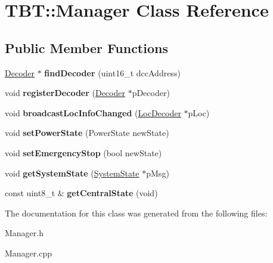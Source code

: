 \hypertarget{classTBT_1_1Manager}{}\section{T\+BT\+:\+:Manager Class Reference}
\label{classTBT_1_1Manager}
\subsection*{Public Member Functions}
\begin{DoxyCompactItemize}
\item 
\mbox{\label{classTBT_1_1Manager_a04d5ae5069f1f17ee682f4ae68141687}} 
\hyperlink{classTBT_1_1Decoder}{Decoder} $\ast$ {\bfseries find\+Decoder} (uint16\+\_\+t dcc\+Address)
\item 
\mbox{\label{classTBT_1_1Manager_a7b20f8a47d78cfd39649722a9fba2f7c}} 
void {\bfseries register\+Decoder} (\hyperlink{classTBT_1_1Decoder}{Decoder} $\ast$p\+Decoder)
\item 
\mbox{\label{classTBT_1_1Manager_aaac6dc1a57d9c578a3da2243584a8a22}} 
void {\bfseries broadcast\+Loc\+Info\+Changed} (\hyperlink{classTBT_1_1LocDecoder}{Loc\+Decoder} $\ast$p\+Loc)
\item 
\mbox{\label{classTBT_1_1Manager_a6e7616a839a1b48d89355bc740ed7793}} 
void {\bfseries set\+Power\+State} (Power\+State new\+State)
\item 
\mbox{\label{classTBT_1_1Manager_af201d9774d2a903ac42f18d724e123c1}} 
void {\bfseries set\+Emergency\+Stop} (bool new\+State)
\item 
\mbox{\label{classTBT_1_1Manager_a007018b4e6441c9af63cb72f1ffc8a19}} 
void {\bfseries get\+System\+State} (\hyperlink{structTBT_1_1SystemState}{System\+State} $\ast$p\+Msg)
\item 
\mbox{\label{classTBT_1_1Manager_a78e5bea49f6662b5f44c1c0aafe4cb75}} 
const uint8\+\_\+t \& {\bfseries get\+Central\+State} (void)
\end{DoxyCompactItemize}


The documentation for this class was generated from the following files\+:\begin{DoxyCompactItemize}
\item 
Manager.\+h\item 
Manager.\+cpp\end{DoxyCompactItemize}
